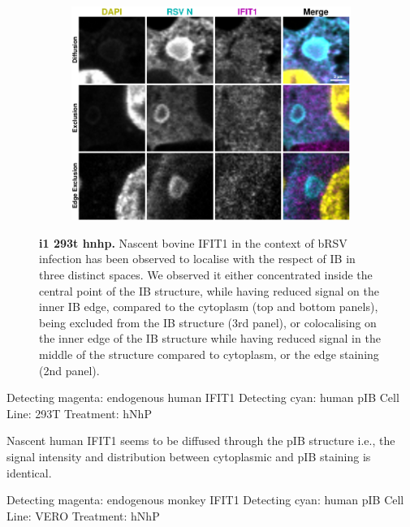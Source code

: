 \begin{figure}
\begin{subfigure}{0.5\textwidth}
    \end{subfigure}
    \begin{subfigure}{1\textwidth}
        \centering
        \caption{}
        \includegraphics[width=1\linewidth]{09. Chapter 4/Figs/03. pIB/01. IFIT1/03. i1-293t-hnhp.pdf}
    \end{subfigure}
    \caption[i1 293t hnhp]{\textbf{i1 293t hnhp.} Nascent bovine IFIT1 in the context of bRSV infection has been observed to localise with the respect of IB in three distinct spaces. We observed it either concentrated inside the central point of the IB structure, while having reduced signal on the inner IB edge, compared to the cytoplasm (top and bottom panels), being excluded from the IB structure (3rd panel), or colocalising on the inner edge of the IB structure while having reduced signal in the middle of the structure compared to cytoplasm, or the edge staining (2nd panel).}
    \label{fig:i1 293t hnhp}
\end{figure}

Detecting magenta: endogenous human IFIT1 \newline
Detecting cyan: human pIB \newline
Cell Line: 293T \newline
Treatment: hNhP \newline

Nascent human IFIT1 seems to be diffused through the pIB structure i.e., the signal intensity and distribution between cytoplasmic and pIB staining is identical.  

Detecting magenta: endogenous monkey IFIT1 \newline
Detecting cyan: human pIB \newline
Cell Line: VERO \newline
Treatment: hNhP \newline


